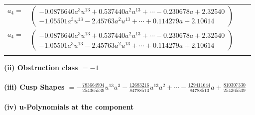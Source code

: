 \documentclass[1p]{elsarticle_modified}
\theoremstyle{definition}
\begin{document}
\begin{tabular}{m{7pt} m{180pt} m{7pt} m{180pt} }
\flushright $a_{4}=$&$\begin{pmatrix}-0.0876640 a^{3} u^{13}+0.537440 a^{2} u^{13}+\cdots-0.230678 a+2.32540\\-1.05501 a^{3} u^{13}-2.45763 a^{2} u^{13}+\cdots+0.114279 a+2.10614\end{pmatrix}$\\ \flushright $a_{4}=$&$\begin{pmatrix}-0.0876640 a^{3} u^{13}+0.537440 a^{2} u^{13}+\cdots-0.230678 a+2.32540\\-1.05501 a^{3} u^{13}-2.45763 a^{2} u^{13}+\cdots+0.114279 a+2.10614\end{pmatrix}$\\&\end{tabular}
\flushleft \textbf{(ii) Obstruction class $= -1$}\\~\\
\flushleft \textbf{(iii) Cusp Shapes $= -\frac{783664904}{254365539} u^{13} a^3-\frac{12683216}{84788513} u^{13} a^2+\cdots-\frac{129411644}{84788513} a+\frac{810307330}{254365539}$}\\~\\
\newpage\renewcommand{\arraystretch}{1}
\flushleft \textbf{(iv) u-Polynomials at the component}\newline \\
\end{document}
